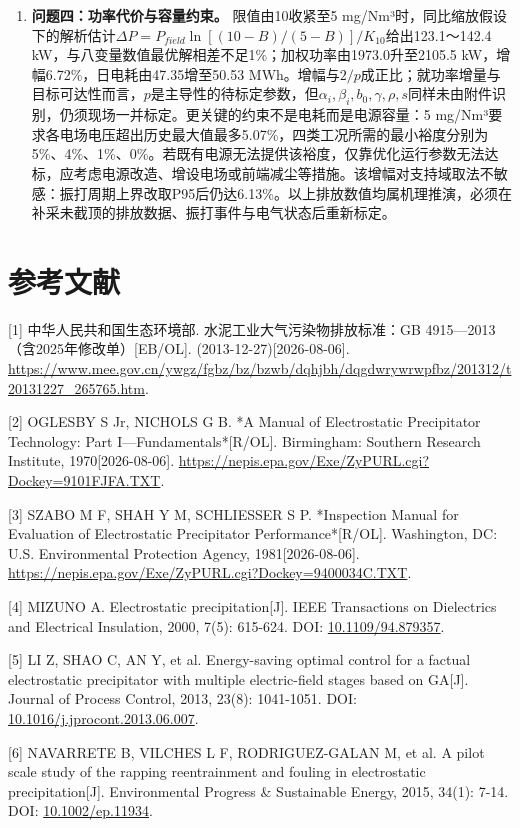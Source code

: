 \documentclass[UTF8,zihao=5,a4paper]{ctexart}
\begin{document}
\begin{enumerate}[itemsep=1pt,topsep=3pt]
\item \textbf{问题四：功率代价与容量约束。} 限值由10收紧至5 mg/Nm³时，同比缩放假设下的解析估计$\Delta P=P_{field}\ln[(10-B)/(5-B)]/K_{10}$给出123.1～142.4 kW，与八变量数值最优解相差不足1\%；加权功率由1973.0升至2105.5 kW，增幅6.72\%，日电耗由47.35增至50.53 MWh。增幅与$2/p$成正比；就功率增量与目标可达性而言，$p$是主导性的待标定参数，但$\alpha_i,\beta_i,b_0,\gamma,\rho,s$同样未由附件识别，仍须现场一并标定。更关键的约束不是电耗而是电源容量：5 mg/Nm³要求各电场电压超出历史最大值最多5.07\%，四类工况所需的最小裕度分别为5\%、4\%、1\%、0\%。若既有电源无法提供该裕度，仅靠优化运行参数无法达标，应考虑电源改造、增设电场或前端减尘等措施。该增幅对支持域取法不敏感：振打周期上界改取P95后仍达6.13\%。以上排放数值均属机理推演，必须在补采未截顶的排放数据、振打事件与电气状态后重新标定。
\end{enumerate}

\section*{参考文献}

[1] 中华人民共和国生态环境部. 水泥工业大气污染物排放标准：GB 4915—2013（含2025年修改单）[EB/OL]. (2013-12-27)[2026-08-06]. \url{https://www.mee.gov.cn/ywgz/fgbz/bz/bzwb/dqhjbh/dqgdwrywrwpfbz/201312/t20131227_265765.htm}.

[2] OGLESBY S Jr, NICHOLS G B. *A Manual of Electrostatic Precipitator Technology: Part I—Fundamentals*[R/OL]. Birmingham: Southern Research Institute, 1970[2026-08-06]. \url{https://nepis.epa.gov/Exe/ZyPURL.cgi?Dockey=9101FJFA.TXT}.

[3] SZABO M F, SHAH Y M, SCHLIESSER S P. *Inspection Manual for Evaluation of Electrostatic Precipitator Performance*[R/OL]. Washington, DC: U.S. Environmental Protection Agency, 1981[2026-08-06]. \url{https://nepis.epa.gov/Exe/ZyPURL.cgi?Dockey=9400034C.TXT}.

[4] MIZUNO A. Electrostatic precipitation[J]. IEEE Transactions on Dielectrics and Electrical Insulation, 2000, 7(5): 615-624. DOI: \url{10.1109/94.879357}.

[5] LI Z, SHAO C, AN Y, et al. Energy-saving optimal control for a factual electrostatic precipitator with multiple electric-field stages based on GA[J]. Journal of Process Control, 2013, 23(8): 1041-1051. DOI: \url{10.1016/j.jprocont.2013.06.007}.

[6] NAVARRETE B, VILCHES L F, RODRIGUEZ-GALAN M, et al. A pilot scale study of the rapping reentrainment and fouling in electrostatic precipitation[J]. Environmental Progress \& Sustainable Energy, 2015, 34(1): 7-14. DOI: \url{10.1002/ep.11934}.
\end{document}
